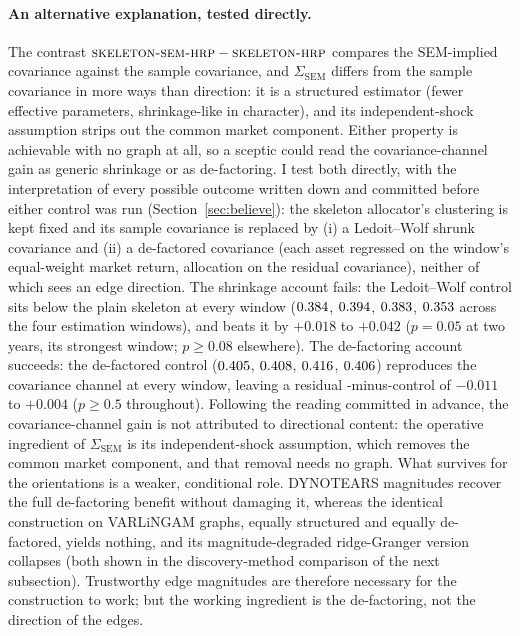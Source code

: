 \paragraph{An alternative explanation, tested directly.} The
contrast $\textsc{skeleton-sem-hrp}{}-\textsc{skeleton-hrp}{}$ compares the SEM-implied covariance
against the sample covariance, and $\Sigma_{\mathrm{SEM}}$ differs from
the sample covariance in more ways than direction: it is a structured
estimator (fewer effective parameters, shrinkage-like in character), and
its independent-shock assumption strips out the common market component.
Either property is achievable with no graph at all, so a sceptic could
read the covariance-channel gain as generic shrinkage or as
de-factoring. I test both directly, with the interpretation of every
possible outcome written down and committed before either control was
run (Section~\ref{sec:believe}): the skeleton allocator's clustering is
kept fixed and its sample covariance is replaced by (i) a Ledoit--Wolf
shrunk covariance \cite{ledoitwolf2004} and (ii) a de-factored covariance (each asset
regressed on the window's equal-weight market return, allocation on the
residual covariance), neither of which sees an edge direction. The
shrinkage account fails: the Ledoit--Wolf control sits below the plain
skeleton at every window ($0.384$, $0.394$,
$0.383$, $0.353$ across the four estimation windows), and
\skelsem{} beats it by $+0.018$ to $+0.042$ ($p=0.05$ at two years, its
strongest window; $p \geq 0.08$ elsewhere).
The de-factoring account succeeds: the de-factored control
($0.405$, $0.408$, $0.416$,
$0.406$) reproduces the covariance channel at every window,
leaving a residual \skelsem{}-minus-control of $-0.011$ to $+0.004$
($p \geq 0.5$ throughout). Following the reading committed in advance,
the
covariance-channel gain is not attributed to directional content: the
operative ingredient of $\Sigma_{\mathrm{SEM}}$ is its independent-shock
assumption, which removes the common market component, and that removal
needs no graph. What survives for the orientations is a weaker,
conditional role. DYNOTEARS magnitudes recover the full de-factoring
benefit without damaging it, whereas the identical construction on
VARLiNGAM graphs, equally structured and equally de-factored, yields
nothing, and its magnitude-degraded ridge-Granger version collapses (both
shown in the discovery-method comparison of the next subsection).
Trustworthy edge magnitudes are therefore necessary for the construction
to work; but the working ingredient is the de-factoring, not the
direction of the edges.

